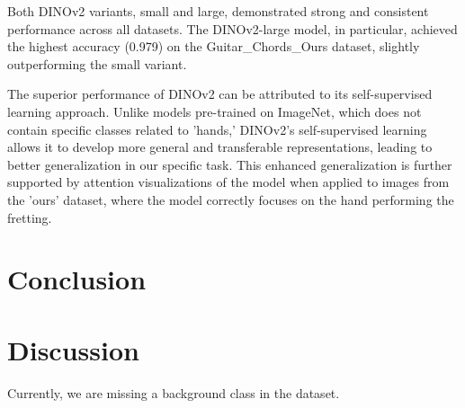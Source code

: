 \documentclass[10pt,twocolumn,letterpaper]{article}
\begin{document}
Both DINOv2 variants, small and large, demonstrated strong and consistent performance across all datasets. The DINOv2-large model, in particular, achieved the highest accuracy (0.979) on the Guitar\_Chords\_Ours dataset, slightly outperforming the small variant.

The superior performance of DINOv2 can be attributed to its self-supervised learning approach. Unlike models pre-trained on ImageNet, which does not contain specific classes related to 'hands,' DINOv2's self-supervised learning allows it to develop more general and transferable representations, leading to better generalization in our specific task. This enhanced generalization is further supported by attention visualizations of the model when applied to images from the 'ours' dataset, where the model correctly focuses on the hand performing the fretting.

\section{Conclusion}

\section{Discussion}
Currently, we are missing a background class in the dataset.


 {\small
  
  
 }
\end{document}
